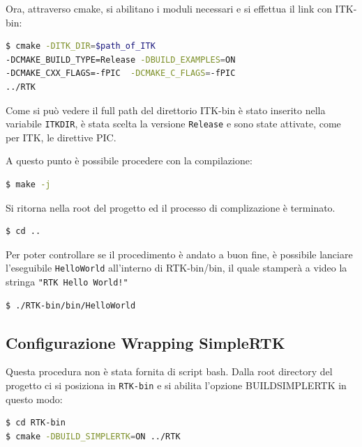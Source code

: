\documentclass[a4paper,11pt, oneside]{article}
\begin{document}
                    Ora, attraverso cmake, si abilitano i moduli necessari e si effettua il link con ITK-bin:
                    \begin{lstlisting}[language=bash, frame=bt]
$ cmake -DITK_DIR=$path_of_ITK 
-DCMAKE_BUILD_TYPE=Release -DBUILD_EXAMPLES=ON 
-DCMAKE_CXX_FLAGS=-fPIC  -DCMAKE_C_FLAGS=-fPIC 
../RTK
                    \end{lstlisting}
                   
                    Come si può vedere il full path del direttorio ITK-bin è stato inserito nella variabile \texttt{ITK\textunderscore DIR}, è stata scelta la versione \texttt{Release} e sono state attivate, come per ITK, le direttive PIC.
    
                    A questo punto è possibile procedere con la compilazione:
                    \begin{lstlisting}[language=bash, frame=bt]
$ make -j
                    \end{lstlisting}
                   
                    Si ritorna nella root del progetto ed il processo di complizazione è terminato.
                    \begin{lstlisting}[language=bash, frame=bt]
$ cd ..
                    \end{lstlisting}
                    
                    Per poter controllare se il procedimento è andato a buon fine, è possibile lanciare l'eseguibile \texttt{HelloWorld} all'interno di RTK-bin/bin, il quale stamperà a video la stringa \texttt{"RTK Hello World!"}
                    \begin{lstlisting}[language=bash, frame=bt]
$ ./RTK-bin/bin/HelloWorld
                    \end{lstlisting}
                    
            \subsection{Configurazione Wrapping SimpleRTK}
                \par
                    Questa procedura non è stata fornita di script bash. Dalla root directory del progetto ci si posiziona in \texttt{RTK-bin} e si abilita l'opzione BUILD\textunderscore SIMPLERTK in questo modo:
                    \begin{lstlisting}[language=bash, frame=bt]
$ cd RTK-bin
$ cmake -DBUILD_SIMPLERTK=ON ../RTK
                    \end{lstlisting}
                    
\end{document}
